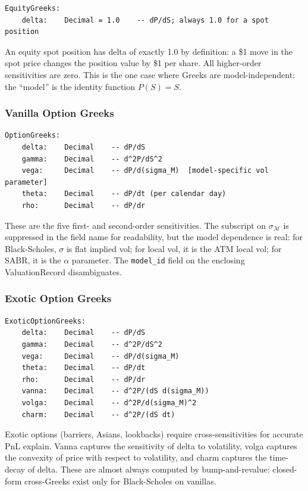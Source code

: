 \documentclass[11pt,a4paper]{article}
\begin{document}
\begin{lstlisting}
EquityGreeks:
    delta:    Decimal = 1.0    -- dP/dS; always 1.0 for a spot position
\end{lstlisting}

\noindent An equity spot position has delta of exactly 1.0 by definition: a \$1 move in the spot price changes the position value by \$1 per share.  All higher-order sensitivities are zero.  This is the one case where Greeks are model-independent: the ``model'' is the identity function $P(S) = S$.

\subsubsection{Vanilla Option Greeks}

\begin{lstlisting}
OptionGreeks:
    delta:    Decimal    -- dP/dS
    gamma:    Decimal    -- d^2P/dS^2
    vega:     Decimal    -- dP/d(sigma_M)  [model-specific vol parameter]
    theta:    Decimal    -- dP/dt (per calendar day)
    rho:      Decimal    -- dP/dr
\end{lstlisting}

\noindent These are the five first- and second-order sensitivities.  The subscript on $\sigma_\mathcal{M}$ is suppressed in the field name for readability, but the model dependence is real: for Black-Scholes, $\sigma$ is flat implied vol; for local vol, it is the ATM local vol; for SABR, it is the $\alpha$ parameter.  The \texttt{model\_id} field on the enclosing ValuationRecord disambiguates.

\subsubsection{Exotic Option Greeks}

\begin{lstlisting}
ExoticOptionGreeks:
    delta:    Decimal    -- dP/dS
    gamma:    Decimal    -- d^2P/dS^2
    vega:     Decimal    -- dP/d(sigma_M)
    theta:    Decimal    -- dP/dt
    rho:      Decimal    -- dP/dr
    vanna:    Decimal    -- d^2P/(dS d(sigma_M))
    volga:    Decimal    -- d^2P/d(sigma_M)^2
    charm:    Decimal    -- d^2P/(dS dt)
\end{lstlisting}

\noindent Exotic options (barriers, Asians, lookbacks) require cross-sensitivities for accurate PnL explain.  Vanna captures the sensitivity of delta to volatility, volga captures the convexity of price with respect to volatility, and charm captures the time-decay of delta.  These are almost always computed by bump-and-revalue: closed-form cross-Greeks exist only for Black-Scholes on vanillas.
\end{document}
